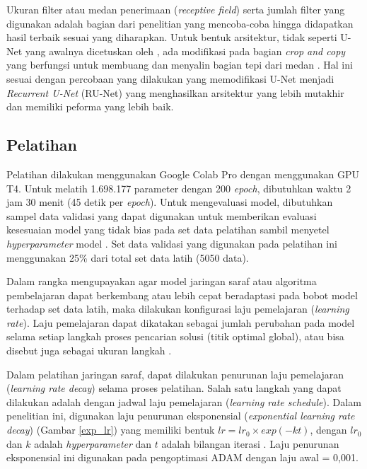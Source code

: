 Ukuran filter atau medan penerimaan (\textit{receptive field}) serta jumlah filter yang digunakan adalah bagian dari penelitian yang mencoba-coba hingga didapatkan hasil terbaik sesuai yang diharapkan. Untuk bentuk arsitektur, tidak seperti U-Net yang awalnya dicetuskan oleh \cite{DBLP:journals/corr/RonnebergerFB15}, ada modifikasi pada bagian \textit{crop and copy} yang berfungsi untuk membuang dan menyalin bagian tepi dari medan \citep{siddique_paheding_elkin_devabhaktuni_2021}. Hal ini sesuai dengan percobaan yang dilakukan \cite{alom2018recurrent} yang memodifikasi U-Net menjadi \textit{Recurrent U-Net} (RU-Net) yang menghasilkan arsitektur yang lebih mutakhir dan memiliki peforma yang lebih baik.

\subsection{Pelatihan}

Pelatihan dilakukan menggunakan Google Colab Pro dengan menggunakan GPU T4. Untuk melatih 1.698.177 parameter dengan 200 \textit{epoch}, dibutuhkan waktu 2 jam 30 menit (45 detik per \textit{epoch}). Untuk mengevaluasi model, dibutuhkan sampel data validasi yang dapat digunakan untuk memberikan evaluasi kesesuaian model yang tidak bias pada set data pelatihan sambil menyetel \textit{hyperparameter} model \citep{elgendy_2020}. Set data validasi yang digunakan pada pelatihan ini menggunakan 25\% dari total set data latih (5050 data).

Dalam rangka mengupayakan agar model jaringan saraf atau algoritma pembelajaran dapat berkembang atau lebih cepat beradaptasi pada bobot model terhadap set data latih, maka dilakukan konfigurasi laju pemelajaran (\textit{learning rate}). Laju pemelajaran dapat dikatakan sebagai jumlah perubahan pada model selama setiap langkah proses pencarian solusi (titik optimal global), atau bisa disebut juga sebagai ukuran langkah \citep{brownlee_2019a}. 

Dalam pelatihan jaringan saraf, dapat dilakukan penurunan laju pemelajaran (\textit{learning rate decay}) selama proses pelatihan. Salah satu langkah yang dapat dilakukan adalah dengan jadwal laju pemelajaran (\textit{learning rate schedule}). Dalam penelitian ini, digunakan laju penurunan eksponensial (\textit{exponential learning rate decay}) (Gambar \ref{exp_lr}) yang memiliki bentuk $lr = lr_0 \times exp(-kt)$, dengan $lr_0$ dan $k$ adalah \textit{hyperparameter} dan $t$ adalah bilangan iterasi \citep{suki_lau_2017}. Laju penurunan eksponensial ini digunakan pada pengoptimasi ADAM \citep{kingma2017adam} dengan laju awal = 0,001.

